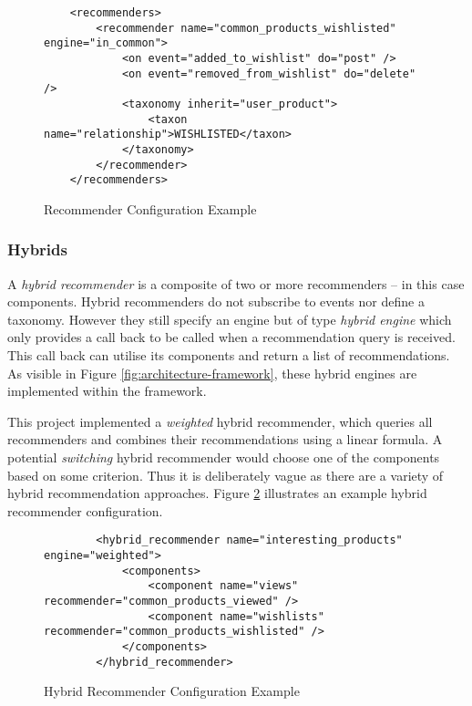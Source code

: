 \begin{figure}[ht]
    \begin{verbatim}
    <recommenders>
        <recommender name="common_products_wishlisted" engine="in_common">
            <on event="added_to_wishlist" do="post" />
            <on event="removed_from_wishlist" do="delete" />
            <taxonomy inherit="user_product">
                <taxon name="relationship">WISHLISTED</taxon>
            </taxonomy>
        </recommender>
    </recommenders>
    \end{verbatim}
    \caption{Recommender Configuration Example}
    \label{fig:architecture-framework-recommender}
\end{figure}

\subsubsection{Hybrids}

A \emph{hybrid recommender} is a composite of two or more recommenders -- in this case components. Hybrid recommenders do not subscribe to events nor define a taxonomy. However they still specify an engine but of type \emph{hybrid engine} which only provides a call back to be called when a recommendation query is received. This call back can utilise its components and return a list of recommendations. As visible in Figure \ref{fig:architecture-framework}, these hybrid engines are implemented within the framework.

This project implemented a \emph{weighted} hybrid recommender, which queries all recommenders and combines their recommendations using a linear formula. A potential \emph{switching} hybrid recommender would choose one of the components based on some criterion. Thus it is deliberately vague as there are a variety of hybrid recommendation approaches. Figure \ref{fig:architecture-framework-hybrid-recommender} illustrates an example hybrid recommender configuration.

\begin{figure}[ht]
    \begin{verbatim}
        <hybrid_recommender name="interesting_products" engine="weighted">
            <components>
                <component name="views" recommender="common_products_viewed" />
                <component name="wishlists" recommender="common_products_wishlisted" />
            </components>
        </hybrid_recommender>
    \end{verbatim}
    \caption{Hybrid Recommender Configuration Example}
    \label{fig:architecture-framework-hybrid-recommender}
\end{figure}

